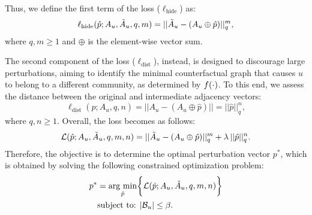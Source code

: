 Thus, we define the first term of the loss ($\ell_{\text{hide}}$) as:
\begin{equation}
    \small
    \ell_{\text{hide}}(\hat{p}; A_u, \tilde{A}_{u}, q, m) = || \tilde{A}_{u} - (A_u \oplus \hat{p})||_q^{m},
\end{equation}
where $q,m \geq 1$ and $\oplus$ is the element-wise vector sum.

The second component of the loss ($\ell_{\text{dist}}$), instead, is designed to discourage large perturbations, aiming to identify the minimal counterfactual graph that causes $u$ to belong to a different community, as determined by $f(\cdot)$.
To this end, we assess the distance between the original and intermediate adjacency vectors:
\begin{equation}
    \ell_{\text{dist}}(\hat{p}; A_u, q, n) = || A_u - (A_u \oplus \hat{p}) || = || \hat{p} ||_q^{n},
\end{equation}
where $q,n \geq 1$. Overall, the loss becomes as follows:
\begin{equation}
\label{eq:ourloss}
    \small
    \mathcal{L}(\hat{p}; A_u, \tilde{A}_{u}, q, m, n) = || \tilde{A}_{u} - (A_u \oplus \hat{p})||_q^{m} + \lambda \, || \hat{p} ||_q^{n}.
\end{equation}
Therefore, the objective is to determine the optimal perturbation vector $p^*$, which is obtained by solving the following constrained optimization problem:
\begin{equation}
\label{eq:p_objective}
\begin{split} 
    p^* & = \underset{\hat{p}}{\text{arg min}} \bigg \lbrace  \mathcal{L}(\hat{p}; A_u, \tilde{A}_{u}, q, m, n) \bigg \rbrace \\
    & \text{subject to: } |\mathcal{B}_{u}| \leq \beta.
\end{split}
\end{equation}

